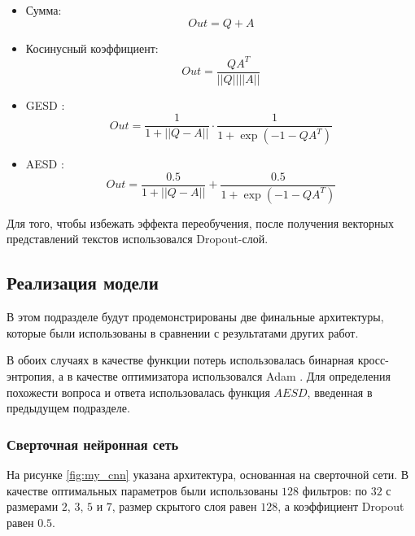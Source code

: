 \documentclass[../diploma.tex]{subfiles}
\begin{document}
\begin{itemize}
\begin{itemize}
\begin{itemize}
				\item
				Сумма: 
				\begin{equation}
					Out = Q + A
   				\end{equation}

				\item
				Косинусный коэффициент: 
				\begin{equation}
					Out = \frac{Q A^T}{||Q|| ||A||}
   				\end{equation}

				\item
				GESD \cite{article:answer_selection}: 
				\begin{equation}
					Out = \frac{1}{1+||Q-A||} \cdot \frac{1}{1+\exp(-1-QA^T)}
   				\end{equation}

				\item
				AESD \cite{article:answer_selection}: 
				\begin{equation}
					Out = \frac{0.5}{1+||Q-A||} + \frac{0.5}{1+\exp(-1-QA^T)}
   				\end{equation}

			\end{itemize}

		\end{itemize}

	\end{itemize}

	Для того, чтобы избежать эффекта переобучения, после получения векторных представлений текстов использовался Dropout-слой.

	\subsection{Реализация модели}

	В этом подразделе будут продемонстрированы две финальные архитектуры, которые были использованы в сравнении с результатами других работ.

	В обоих случаях в качестве функции потерь использовалась бинарная кросс-энтропия, а в качестве оптимизатора использовался Adam \cite{article:adam}.
    Для определения похожести вопроса и ответа использовалась функция $AESD$, введенная в предыдущем подразделе.

	\subsubsection{Сверточная нейронная сеть}

	На рисунке \ref{fig:my_cnn} указана архитектура, основанная на сверточной сети.
	В качестве оптимальных параметров были использованы $128$ фильтров: по $32$ с размерами $2$, $3$, $5$ и $7$, размер скрытого слоя равен $128$, 
	а коэффициент Dropout равен $0.5$.
\end{document}

